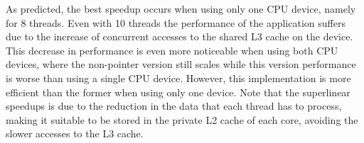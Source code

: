 As predicted, the best speedup occurs when using only one CPU device, namely for 8 threads. Even with 10 threads the performance of the application suffers due to the increase of concurrent accesses to the shared L3 cache on the device. This decrease in performance is even more noticeable when using both CPU devices, where the non-pointer version still scales while this version performance is worse than using a single CPU device. However, this implementation is more efficient than the former when using only one device. Note that the superlinear speedups is due to the reduction in the data that each thread has to process, making it suitable to be stored in the private L2 cache of each core, avoiding the slower accesses to the L3 cache.
